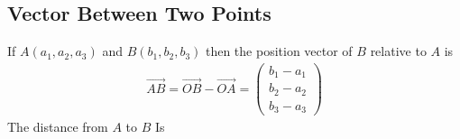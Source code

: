 \documentclass[10pt, a4paper, titlepage]{article}
\begin{document}
\begin{multicols*}{3}
\subsection{Vector Between Two Points}
If $A(a_1,a_2,a_3)$ and $B(b_1,b_2,b_3)$ then the position vector of $B$ relative to $A$ is 
\begin{align}
	\overrightarrow{AB}=\overrightarrow{OB}-\overrightarrow{OA}=\begin{pmatrix}b_1-a_1\\ b_2-a_2 \\b_3-a_3\end{pmatrix}
\end{align}
The distance from $A$ to $B$ Is
\end{multicols*}
\end{document}
